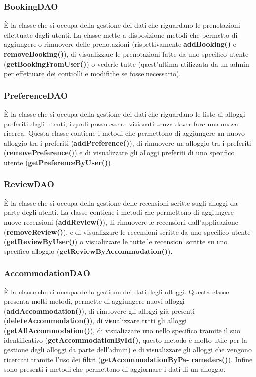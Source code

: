 \documentclass[10pt]{article}
\begin{document}
\subsubsection{BookingDAO}

\`E la classe che si occupa della gestione dei dati che riguardano le prenotazioni effettuate dagli utenti. La classe mette a disposizione metodi che permetto di aggiungere o rimuovere delle prenotazioni (rispettivamente \textbf{addBooking()} e \textbf{removeBooking()}), di visualizzare le prenotazioni fatte da uno specifico utente (\textbf{getBookingFromUser()}) o vederle tutte (quest'ultima utilizzata da un admin per effettuare dei controlli e modifiche se fosse necessario).

\subsubsection{PreferenceDAO}

\`E la classe che si occupa della gestione dei dati che riguardano le liste di alloggi preferiti dagli utenti, i quali posso essere visionati senza dover fare una nuova ricerca. Questa classe contiene i metodi che permettono di aggiungere un nuovo alloggio tra i preferiti (\textbf{addPreference()}), di rimuovere un alloggio tra i preferiti (\textbf{removePreference()}) e di visualizzare gli alloggi preferiti di uno specifico utente (\textbf{getPreferenceByUser()}). 

\subsubsection{ReviewDAO}

\`E la classe che si occupa della gestione delle recensioni scritte sugli alloggi da parte degli utenti. La classe contiene i metodi che permettono di aggiungere nuove recensioni (\textbf{addReview()}), di rimuovere le recensioni dall'applicazione (\textbf{removeReview()}), e di visualizzare le recensioni scritte da uno specifico utente (\textbf{getReviewByUser()}) o visualizzare le tutte le recensioni scritte su uno specifico alloggio (\textbf{getReviewByAccommodation()}). 

\subsubsection{AccommodationDAO}

\`E la classe che si occupa della gestione dei dati degli alloggi. Questa classe presenta molti metodi, permette di aggiungere nuovi alloggi (\textbf{addAccommodation()}), di rimuovere gli alloggi già presenti (\textbf{deleteAccommodation()}), di visualizzare tutti gli alloggi (\textbf{getAllAccommodation()}), di visualizzare uno nello specifico tramite il suo identificativo (\textbf{getAccommodationById()}, questo metodo è molto utile per la gestione degli alloggi da parte dell'admin) e di visualizzare gli alloggi che vengono ricercati tramite l'uso dei filtri
(\textbf{getAccommodationByPa-}
\newline
\textbf{rameters()}). Infine sono presenti i metodi che permettono di aggiornare i dati di un alloggio. 
\end{document}
